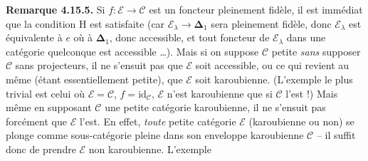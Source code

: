 \documentclass[11pt]{article}
\newcommand{\cE}{\mathcal{E}}
\newcommand{\cC}{\mathcal{C}}
\newcommand{\id}{\mathrm{id}}
\begin{document}
\textbf{Remarque 4.15.5.} Si $f : \cE \longrightarrow \cC$ est un foncteur pleinement fidèle, il est immédiat que la condition H est satisfaite (car $\cE_{\lambda} \longrightarrow \mathbf{\Delta}_1$ sera pleinement fidèle, donc $\cE_{\lambda}$ est équivalente
à $e$ où à $\mathbf{\Delta}_1$, donc accessible, et tout foncteur de $\cE_{\lambda}$ dans une catégorie quelconque est %
accessible \dots). Mais si on suppose $\cC$ petite \textit{sans} supposer $\cC$ sans projecteurs, il ne s'ensuit pas que $\cE$ soit accessible, ou ce qui revient au même (étant essentiellement petite), que $\cE$ soit karoubienne. (L'exemple le plus trivial est celui où $\cE = \cC$, $f = \id_{\cC}$, $\cE$ n'est karoubienne que si $\cC$ l'est !) Mais même en supposant $\cC$ une petite catégorie karoubienne, il ne s'ensuit pas forcément que $\cE$ l'est. En effet, \textit{toute} petite catégorie $\cE$ (karoubienne ou non) se plonge comme sous-catégorie pleine dans son enveloppe karoubienne $\cC$ -- il suffit donc de prendre $\cE$ non karoubienne. L'exemple
\end{document}
